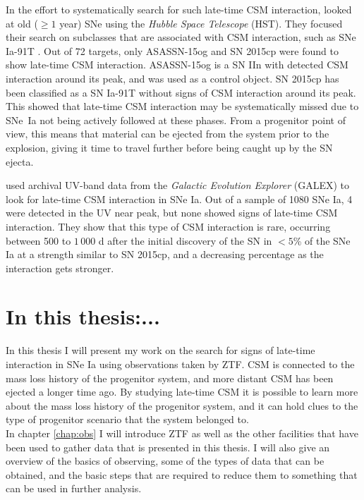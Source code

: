 \documentclass[a4paper,oneside,12pt, class=Latex/Classes/PhDthesisPSnPDF, crop=false]{standalone}
\begin{document}
In the effort to systematically search for such late-time CSM interaction, \citet{2015cp} looked at old ($\geq1$ year) SNe using the \textit{Hubble Space Telescope} (HST). They focused their search on subclasses that are associated with CSM interaction, such as SNe Ia-91T \citep{Ia-CSM_and_91T_connection}. Out of 72 targets, only ASASSN-15og and SN 2015cp were found to show late-time CSM interaction. ASASSN-15og is a SN IIn with detected CSM interaction around its peak, and was used as a control object. SN 2015cp has been classified as a SN Ia-91T without signs of CSM interaction around its peak. This showed that late-time CSM interaction may be systematically missed due to SNe~Ia not being actively followed at these phases. From a progenitor point of view, this means that material can be ejected from the system prior to the explosion, giving it time to travel further before being caught up by the SN ejecta.

\citet{GALEX_Late_CSM} used archival UV-band data from the \textit{Galactic Evolution Explorer} (GALEX) to look for late-time CSM interaction in SNe Ia. Out of a sample of 1080 SNe Ia, 4 were detected in the UV near peak, but none showed signs of late-time CSM interaction. They show that this type of CSM interaction is rare, occurring between 500 to $1\,000$ d after the initial discovery of the SN in $<5$\% of the SNe Ia at a strength similar to SN 2015cp, and a decreasing percentage as the interaction gets stronger.


\section{In this thesis:...}
In this thesis I will present my work on the search for signs of late-time interaction in SNe Ia using observations taken by ZTF. CSM is connected to the mass loss history of the progenitor system, and more distant CSM has been ejected a longer time ago. By studying late-time CSM it is possible to learn more about the mass loss history of the progenitor system, and it can hold clues to the type of progenitor scenario that the system belonged to.\\

In chapter \ref{chap:obs} I will introduce ZTF as well as the other facilities that have been used to gather data that is presented in this thesis. I will also give an overview of the basics of observing, some of the types of data that can be obtained, and the basic steps that are required to reduce them to something that can be used in further analysis.
\end{document}

